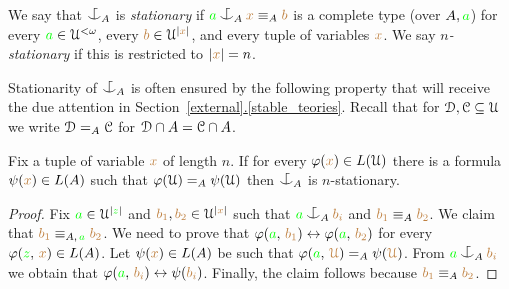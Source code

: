 \documentclass[creche.tex]{subfiles}
\begin{document}
\begin{definition}\label{def_coheir_stationary}We say that $\nonforkc_A$ is \emph{stationary\/} if ${\gr a}\nonforkc_A{\mr x}\equiv_A{\mr b}$ is a complete type (over $A,{\color{green} a}$) for every ${\color{green} a}\in\EuScript U^{<\omega}$, every ${\color{brown} b}\in\EuScript U^{|{\color{brown} x}|}$, and every tuple of variables ${\color{brown} x}$.
We say \emph{$n$-stationary\/} if this is restricted to $|{\color{brown} x}|=n$.\QED
\end{definition}

Stationarity of $\nonforkc_A$ is often ensured by the following property that will receive the due attention in Section~\hyperref[stable_teories]{\ref*{external}.\ref*{stable_teories}}. Recall that for $\EuScript D,\EuScript C\subseteq\EuScript U$ we write $\EuScript D=_A\EuScript C$ for $\EuScript D\cap A=\EuScript C\cap A$.

\begin{proposition}
Fix a tuple of variable ${\color{brown} x}$ of length $n$.
If for every $\varphi({\color{brown} x})\in L(\EuScript U)$ there is a formula $\psi({\color{brown} x})\in L(A)$ such that $\varphi(\EuScript U)=_A\psi(\EuScript U)$ then $\nonforkc_A$ is $n$-stationary.
\end{proposition}

\begin{proof}
Fix ${\color{green} a}\in\EuScript U^{|{\color{green} z}|}$ and  ${\color{brown} b_1},{\color{brown} b_2}\in\EuScript U^{|{\color{brown} x}|}$ 
such that ${\gr a}\nonforkc_A{\mr b_i}$ and ${\color{brown} b_1}\equiv_A{\color{brown} b_2}$.
We claim that ${\color{brown} b_1}\equiv_{A,\,{\color{green} a}}{\color{brown} b_2}$.
We need to prove that $\varphi({\color{green} a},\,{\color{brown} b_1})\leftrightarrow\varphi({\color{green} a},\,{\color{brown} b_2})$ 
for every  $\varphi({\color{green} z},\,{\color{brown} x})\in L(A)$.
Let $\psi({\color{brown} x})\in L(A)$ be such that $\varphi({\color{green} a},\,{\color{brown} \EuScript U})=_A\psi({\color{brown} \EuScript U})$.
From ${\gr a}\nonforkc_A{\mr b_i}$ we obtain that  $\varphi({\color{green} a},\,{\color{brown} b_i})\leftrightarrow\psi({\color{brown} b_i})$.
Finally, the claim follows because ${\color{brown} b_1}\equiv_A{\color{brown} b_2}$.
\end{proof}



% 
\end{document}
